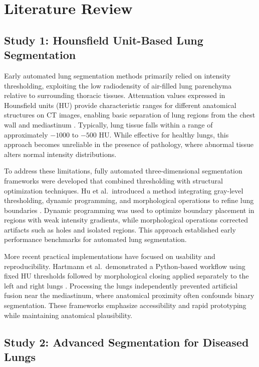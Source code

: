 \section{Literature Review}

\subsection{Study 1: Hounsfield Unit-Based Lung Segmentation}

Early automated lung segmentation methods primarily relied on intensity thresholding, exploiting the low radiodensity of air-filled
lung parenchyma relative to surrounding thoracic tissues. Attenuation values expressed in Hounsfield units (HU) provide characteristic
ranges for different anatomical structures on CT images, enabling basic separation of lung regions from the chest wall and mediastinum \cite{radiographics2015}.
Typically, lung tissue falls within a range of approximately \(-1000\) to \(-500\) HU. While effective for healthy lungs, this approach
becomes unreliable in the presence of pathology, where abnormal tissue alters normal intensity distributions.

To address these limitations, fully automated three-dimensional segmentation frameworks were developed that combined thresholding
with structural optimization techniques. Hu et al.\ introduced a method integrating gray-level thresholding, dynamic programming,
and morphological operations to refine lung boundaries \cite{ieee2001}. Dynamic programming was used to optimize boundary placement
in regions with weak intensity gradients, while morphological operations corrected artifacts such as holes and isolated regions.
This approach established early performance benchmarks for automated lung segmentation.

More recent practical implementations have focused on usability and reproducibility. Hartmann et al.\ demonstrated a Python-based
workflow using fixed HU thresholds followed by morphological closing applied separately to the left and right lungs \cite{hartmann2020}.
Processing the lungs independently prevented artificial fusion near the mediastinum, where anatomical proximity often confounds
binary segmentation. These frameworks emphasize accessibility and rapid prototyping while maintaining anatomical plausibility.

\subsection{Study 2: Advanced Segmentation for Diseased Lungs}

